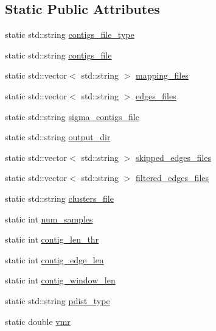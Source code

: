 \subsection*{Static Public Attributes}
\begin{DoxyCompactItemize}
\item 
static std::string \hyperlink{classSigma_a27244771a8b20af2f27924fe3a6bedd6}{contigs\_\-file\_\-type}
\item 
static std::string \hyperlink{classSigma_a2bb972d1c9db318b5616cf2dc211fbfa}{contigs\_\-file}
\item 
static std::vector$<$ std::string $>$ \hyperlink{classSigma_a31a4de140e200e02a079d34d313ce618}{mapping\_\-files}
\item 
static std::vector$<$ std::string $>$ \hyperlink{classSigma_a30434aee9f491592a8e06c44c6e49844}{edges\_\-files}
\item 
static std::string \hyperlink{classSigma_a57d2b73a5f595d5a91fab60d5663b0e0}{sigma\_\-contigs\_\-file}
\item 
static std::string \hyperlink{classSigma_a5693c7923c23c51fb05eb6946a7adfc6}{output\_\-dir}
\item 
static std::vector$<$ std::string $>$ \hyperlink{classSigma_a63939e07896d76725a80c6ad94df53da}{skipped\_\-edges\_\-files}
\item 
static std::vector$<$ std::string $>$ \hyperlink{classSigma_add16cab45b900fff34bedc48754facfc}{filtered\_\-edges\_\-files}
\item 
static std::string \hyperlink{classSigma_a31669f94dd223ec178a1bdb7b818517b}{clusters\_\-file}
\item 
static int \hyperlink{classSigma_a898fdf105adde827c4fc00d63c056e87}{num\_\-samples}
\item 
static int \hyperlink{classSigma_aed71635cf9007c2df2c869dac627aa63}{contig\_\-len\_\-thr}
\item 
static int \hyperlink{classSigma_aa38e6db83d0cc7fb63dba03eb157c522}{contig\_\-edge\_\-len}
\item 
static int \hyperlink{classSigma_a388ca75430d14e589b9e99933973b454}{contig\_\-window\_\-len}
\item 
static std::string \hyperlink{classSigma_a475c2fd313149f708f0907b981e57b1e}{pdist\_\-type}
\item 
static double \hyperlink{classSigma_a8c00846e88a130c77f0e7cad5c50a187}{vmr}
\end{DoxyCompactItemize}

